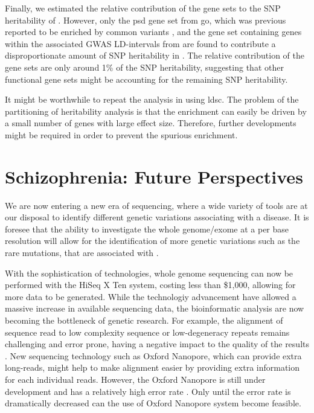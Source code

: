 \documentclass[12pt]{scrbook}
\newcommand*{\glng}{\glsentrylong}
\begin{document}
	Finally, we estimated the relative contribution of the gene sets to the \gls{SNP} heritability of \glng{scz}. 
	However, only the \gls{psd} gene set from \gls{go}, which was previous reported to be enriched by common variants \citep{Consortium2015a}, and the gene set containing genes within the associated \gls{GWAS} LD-intervals from \citet{Purcell2014} are found to contribute a disproportionate amount of \gls{SNP} heritability in \glng{scz}.
	The relative contribution of the gene sets are only around 1\% of the \gls{SNP} heritability, suggesting that other functional gene sets might be accounting for the remaining \gls{SNP} heritability.
	
	It might be worthwhile to repeat the analysis in \citet{Consortium2015a} using \gls{ldsc}.
	The problem of the partitioning of heritability analysis is that the enrichment can easily be driven by a small number of genes with large effect size. 
	Therefore, further developments might be required in order to prevent the spurious enrichment. 
	
	\section{Schizophrenia: Future Perspectives}
	We are now entering a new era of sequencing, where a wide variety of tools are at our disposal to identify different genetic variations associating with a disease. 
	It is foresee that the ability to investigate the whole genome/exome at a per base resolution will allow for the identification of more genetic variations such as the rare mutations, that are associated with \glng{scz}.
	
	With the sophistication of technologies, whole genome sequencing can now be performed with the HiSeq \RN{10} Ten system, costing less than \$1,000, allowing for more data to be generated. 
	While the technologiy advancement have allowed a massive increase in available sequencing data, the bioinformatic analysis are now becoming the bottleneck of genetic research.
	For example, the alignment of sequence read to low complexity sequence or low-degeneracy repeats remains challenging and error prone, having a negative impact to the quality of the results \citep{Sims2014}. 
	New sequencing technology such as Oxford Nanopore, which can provide extra long-reads, might help to make alignment easier by providing extra information for each individual reads.
	However, the Oxford Nanopore is still under development and has a relatively high error rate \citep{Mikheyev2014}. 
	Only until the error rate is dramatically decreased can the use of Oxford Nanopore system become feasible. 
		
\end{document}
